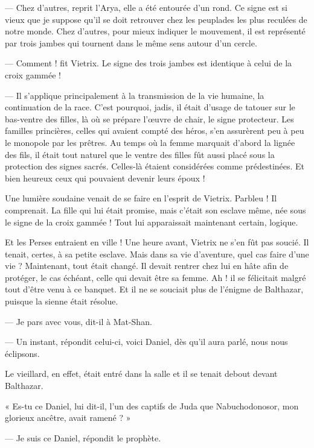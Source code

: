 \documentclass[a4paper, 11pt, oneside, polutonikogreek, french]{article}
\begin{document}
--- Chez d'autres, reprit l'Arya, elle a été entourée d'un rond. Ce signe est si vieux que je suppose qu'il se doit retrouver chez les peuplades les plus reculées de notre monde. Chez d'autres, pour mieux indiquer le mouvement, il est représenté par trois jambes qui tournent dans le même sens autour d'un cercle.

--- Comment ! fit Vietrix. Le signe des trois jambes est identique à celui de la croix gammée !

--- Il s'applique principalement à la transmission de la vie humaine, la continuation de la race. C'est pourquoi, jadis, il était d'usage de tatouer sur le bas-ventre des filles, là où se prépare l'œuvre de chair, le signe protecteur. Les familles princières, celles qui avaient compté des héros, s'en assurèrent peu à peu le monopole par les prêtres. Au temps où la femme marquait d'abord la lignée des fils, il était tout naturel que le ventre des filles fût aussi placé sous la protection des signes sacrés. Celles-là étaient considérées comme prédestinées. Et bien heureux ceux qui pouvaient devenir leurs époux !

Une lumière soudaine venait de se faire en l'esprit de Vietrix. Parbleu ! Il comprenait. La fille qui lui était promise, mais c'était son esclave même, née sous le signe de la croix gammée ! Tout lui apparaissait maintenant certain, logique.

Et les Perses entraient en ville ! Une heure avant, Vietrix ne s'en fût pas soucié. Il tenait, certes, à sa petite esclave. Mais dans sa vie d'aventure, quel cas faire d'une vie ? Maintenant, tout était changé. Il devait rentrer chez lui en hâte afin de protéger, le cas échéant, celle qui devait être sa femme. Ah ! il se félicitait malgré tout d'être venu à ce banquet. Et il ne se souciait plus de l'énigme de Balthazar, puisque la sienne était résolue.

--- Je pars avec vous, dit-il à Mat-Shan.

--- Un instant, répondit celui-ci, voici Daniel, dès qu'il aura parlé, nous nous éclipsons.

\bigskip
\centerline{\EightStarTaper}
\centerline{\EightStarTaper\EightStarTaper}
\bigskip

Le vieillard, en effet, était entré dans la salle et il se tenait debout devant Balthazar.

« Es-tu ce Daniel, lui dit-il, l'un des captifs de Juda que Nabuchodonosor, mon glorieux ancêtre, avait ramené ? »

--- Je suis ce Daniel, répondit le prophète.
\end{document}
